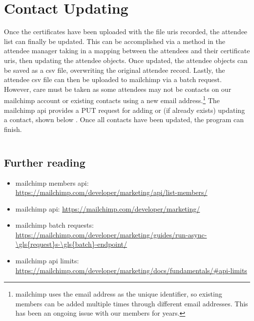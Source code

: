 \documentclass[11pt]{article}
\begin{document}
\newpage

\section{Contact Updating}

Once the certificates have been uploaded with the file \acrshort{uri}s recorded, the attendee list can finally be updated. This can be accomplished via a method in the attendee manager taking in a mapping between the attendees and their certificate \acrshort{uri}s, then updating the attendee \glspl{object}. Once updated, the attendee \glspl{object} can be saved as a \acrshort{csv} file, overwriting the original attendee record. Lastly, the attendee \acrshort{csv} file can then be uploaded to \Gls{mailchimp} via a \gls{batch} \gls{request}. However, care must be taken as some attendees may not be contacts on our \Gls{mailchimp} account or existing contacts using a new email address.\footnote{\Gls{mailchimp} uses the email address as the unique identifier, so existing members can be added multiple times through different email addresses. This has been an ongoing issue with our members for years.} The \Gls{mailchimp} \acrshort{api} provides a PUT \gls{request} for adding or (if already exists) updating a contact, shown below \cite{mailchimp-update-member}. Once all contacts have been updated, the program can finish.

\inputminted[linenos=true]{python}{mailchimp_examples/add_or_update_member.py}

\subsection{Further reading}

\begin{itemize}
    \item \Gls{mailchimp} members \acrshort{api}: \url{https://mailchimp.com/developer/marketing/api/list-members/}
    \item \Gls{mailchimp} \acrshort{api}: \url{https://mailchimp.com/developer/marketing/}
    \item \Gls{mailchimp} \gls{batch} \gls{request}s: \url{https://mailchimp.com/developer/marketing/guides/run-async-\gls{request}s-\gls{batch}-endpoint/}
    \item \Gls{mailchimp} \acrshort{api} limits: \url{https://mailchimp.com/developer/marketing/docs/fundamentals/#api-limits}
\end{itemize}
\end{document}
